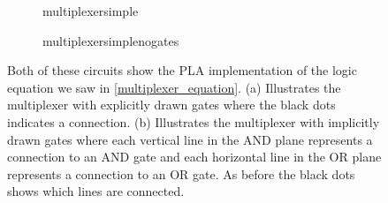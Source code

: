             \begin{figure}[h!]
                \hspace*{-1cm}
                \begin{subfigure}[t]{0.5\textwidth}
                    \vskip 0pt
                    \centering
                    {multiplexersimple}
                    \caption{ }
                    \label{fig:MultiplexerSimpleA}
                \end{subfigure}%
                \begin{subfigure}[t]{0.5\textwidth}
                    \vskip 0pt
                    {multiplexersimplenogates}
                    \caption{ }
                    \label{fig:MultiplexerSimpleB}
                \end{subfigure}%
                \caption{Both of these circuits show the PLA implementation of the logic equation we saw in \ref{multiplexer_equation}. (a) Illustrates the multiplexer with explicitly drawn gates where the black dots indicates a connection. (b) Illustrates the multiplexer with implicitly drawn gates where each vertical line in the AND plane represents a connection to an AND gate and each horizontal line in the OR plane represents a connection to an OR gate. As before the black dots shows which lines are connected.}
                
            \end{figure}
        
        
